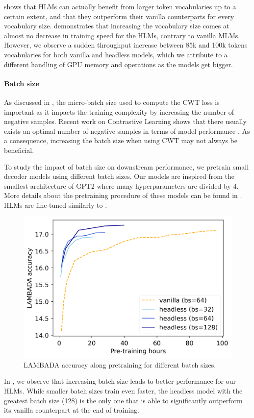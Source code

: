  shows that HLMs can actually benefit from larger token vocabularies up to a certain extent, and that they outperform their vanilla counterparts for every vocabulary size.  demonstrates that increasing the vocabulary size comes at almost no decrease in training speed for the HLMs, contrary to vanilla MLMs. However, we observe a sudden throughput increase between 85k and 100k tokens vocabularies for both vanilla and headless models, which we attribute to a different handling of GPU memory and operations as the models get bigger.

\paragraph{Batch size}

As discussed in , the micro-batch size used to compute the CWT loss is important as it impacts the training complexity by increasing the number of negative samples. Recent work on Contrastive Learning shows that there usually exists an optimal number of negative samples in terms of model performance \citep{contr1, contr2}. As a consequence, increasing the batch size when using CWT may not always be beneficial.

To study the impact of batch size on downstream performance, we pretrain small decoder models using different batch sizes. Our models are inspired from the smallest architecture of GPT2 \citep{gpt2} where many hyperparameters are divided by 4. More details about the pretraining procedure of these models can be found in . HLMs are fine-tuned similarly to .

\begin{figure}[h]
    \centering
    \includegraphics[width=0.40\linewidth]{sources/part_2/headless/imgs/batch_size_hours_p13.png}
    \caption{LAMBADA accuracy along pretraining for different batch sizes.}
    \label{fig:batch_size}
\end{figure}

In , we observe that increasing batch size  leads to better performance for our HLMs. While smaller batch sizes train even faster, the headless model with the greatest batch size (128) is the only one that is able to significantly outperform its vanilla counterpart at the end of training.

